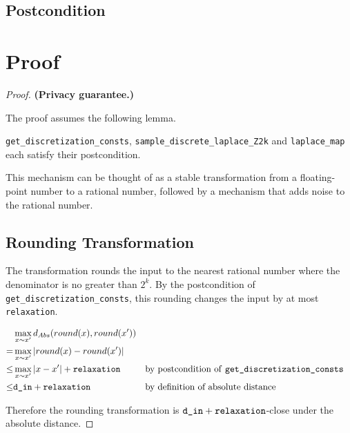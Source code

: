 \documentclass{article}
\begin{document}
\subsection*{Postcondition}


\section{Proof}

\begin{proof} 
\textbf{(Privacy guarantee.)} 
    
\begin{tcolorbox}
    The proof assumes the following lemma.
    \begin{lemma}
        \texttt{get\_discretization\_consts}, \texttt{sample\_discrete\_laplace\_Z2k} and \texttt{laplace\_map} each satisfy their postcondition.
    \end{lemma}
\end{tcolorbox}

This mechanism can be thought of as a stable transformation from a floating-point number to a rational number,
followed by a mechanism that adds noise to the rational number.

\subsection{Rounding Transformation}

The transformation rounds the input to the nearest rational number where the denominator is no greater than $2^k$.
By the postcondition of \texttt{get\_discretization\_consts}, this rounding changes the input by at most \texttt{relaxation}.

\begin{align*}
    &\max_{x \sim x'} d_{Abs}(round(x), round(x')) \\
    =& \max_{x \sim x'} \left| round(x) - round(x') \right| \\
    \leq& \max_{x \sim x'} \left| x - x' \right| + \texttt{relaxation} &&\text{by postcondition of \texttt{get\_discretization\_consts}} \\
    \leq& \texttt{d\_in} + \texttt{relaxation} &&\text{by definition of absolute distance}
\end{align*}

Therefore the rounding transformation is $\texttt{d\_in} + \texttt{relaxation}$-close under the absolute distance.


\end{proof}
\end{document}
